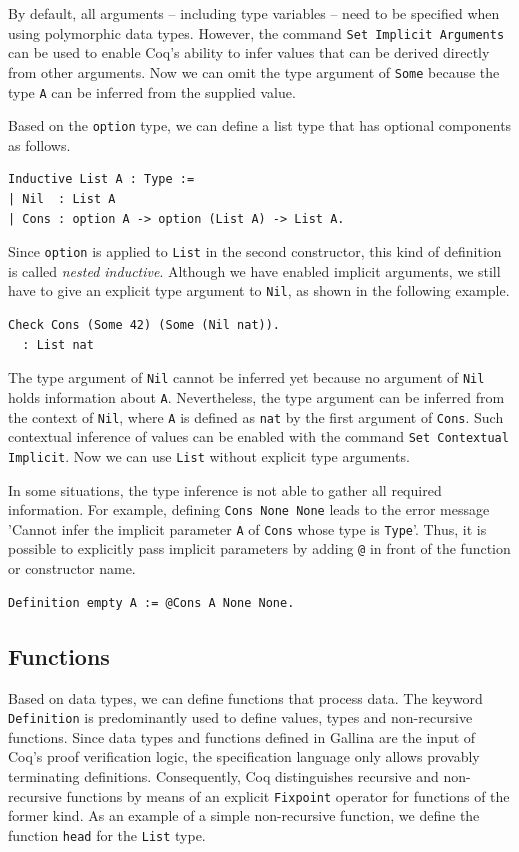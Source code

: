 \documentclass[a4paper, 11pt, fleqn, twoside]{scrreprt}
\newcommand{\cinl}[1]{\texttt{#1}}
\begin{document}
By default, all arguments -- including type variables -- need to be specified when using polymorphic data types.
However, the command \cinl{Set Implicit Arguments} can be used to enable Coq's ability to infer values that can be derived directly from other arguments.
Now we can omit the type argument of \cinl{Some} because the type \cinl{A} can be inferred from the supplied value.

Based on the \cinl{option} type, we can define a list type that has optional components as follows.
\begin{verbatim}
Inductive List A : Type :=
| Nil  : List A
| Cons : option A -> option (List A) -> List A.
\end{verbatim}

Since \cinl{option} is applied to \cinl{List} in the second constructor, this kind of definition is called \textit{nested inductive}.
Although we have enabled implicit arguments, we still have to give an explicit type argument to \cinl{Nil}, as shown in the following example.

\begin{verbatim}
Check Cons (Some 42) (Some (Nil nat)).
  : List nat
\end{verbatim}

The type argument of \cinl{Nil} cannot be inferred yet because no argument of \cinl{Nil} holds information about \cinl{A}.
Nevertheless, the type argument can be inferred from the context of \cinl{Nil}, where \cinl{A} is defined as \cinl{nat} by the first argument of \cinl{Cons}.
Such contextual inference of values can be enabled with the command \cinl{Set Contextual Implicit}.
Now we can use \cinl{List} without explicit type arguments.

In some situations, the type inference is not able to gather all required information.
For example, defining \cinl{Cons None None} leads to the error message 'Cannot infer the implicit parameter \cinl{A} of \cinl{Cons} whose type is \cinl{Type}'.
Thus, it is possible to explicitly pass implicit parameters by adding \cinl{@} in front of the function or constructor name.
\begin{verbatim}
Definition empty A := @Cons A None None.
\end{verbatim}

\subsection{Functions}
\label{subsec:coqFunctions}

Based on data types, we can define functions that process data.
The keyword \cinl{Definition} is predominantly used to define values, types and non-recursive functions.
Since data types and functions defined in Gallina are the input of Coq's proof verification logic, the specification language only allows provably terminating definitions.
Consequently, Coq distinguishes recursive and non-recursive functions by means of an explicit \cinl{Fixpoint} operator for functions of the former kind.
As an example of a simple non-recursive function, we define the function \cinl{head} for the \cinl{List} type.
\end{document}
